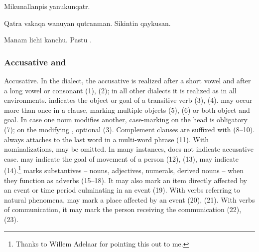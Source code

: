 {%
{Mikunallanpis yanukunqatr.}%
{}%
{}{}%

%
{Qatra vakaqa wanuyan qutranman. Sikintin qaykusan.}%
{}%
{}{}%

%
{Manam lichi kanchu. Pastu .}%
{}%
{}{}%

\subsubsection{Accusative  and }
Accusative. In the \CH{} dialect, the accusative is realized  after a short vowel and  after a long vowel or consonant (1), (2); in all other dialects it is realized as  in all environments.  indicates the object or goal of a transitive verb (3), (4).  may occur more than once in a clause, marking multiple objects (5), (6) or both object and goal. In case one noun modifies another, case-marking on the head  is obligatory (7); on the modifying , optional (3). Complement clauses are suffixed with  (8--10).  always attaches to the last word in a multi-word phrase (11). With  nominalizations,  may be omitted. In many instances,  does not indicate accusative case.  may indicate the goal of movement of a person (12), (13),  may indicate  (14).\footnote{Thanks to Willem Adelaar for pointing this out to me.}  marks substantives -- nouns, adjectives, numerals, derived nouns -- when they function as adverbs (15--18). It may also mark an item directly affected by an event or time period culminating in an event (19). With verbs referring to natural phenomena,  may mark a place affected by an event (20), (21). With verbs of communication, it may mark the person receiving the communication (22), (23).

}
